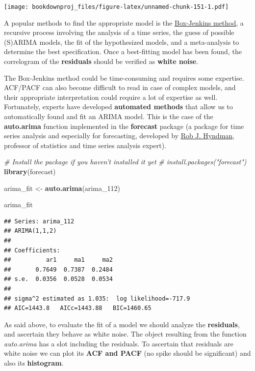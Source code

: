 \documentclass[
]{article}
\newenvironment{Shaded}{\begin{snugshade}}{\end{snugshade}}
\newcommand{\CommentTok}[1]{\textcolor[rgb]{0.56,0.35,0.01}{\textit{#1}}}
\newcommand{\DecValTok}[1]{\textcolor[rgb]{0.00,0.00,0.81}{#1}}
\newcommand{\KeywordTok}[1]{\textcolor[rgb]{0.13,0.29,0.53}{\textbf{#1}}}
\newcommand{\NormalTok}[1]{#1}
\newcommand{\StringTok}[1]{\textcolor[rgb]{0.31,0.60,0.02}{#1}}
\begin{document}
\texttt{[image: bookdownproj\_files/figure-latex/unnamed-chunk-151-1.pdf]}

A popular methods to find the appropriate model is the \href{https://en.wikipedia.org/wiki/Box–Jenkins_method}{Box-Jenkins method}, a recursive process involving the analysis of a time series, the guess of possible (S)ARIMA models, the fit of the hypothesized models, and a meta-analysis to determine the best specification. Once a best-fitting model has been
found, the correlogram of the \textbf{residuals} should be verified as \textbf{white noise}.

The Box-Jenkins method could be time-consuming and requires some expertise. ACF/PACF can also become difficult to read in case of complex models, and their appropriate interpretation could require a lot of expertise as well. Fortunately, experts have developed \textbf{automated methods} that allow us to automatically found and fit an ARIMA model. This is the case of the \textbf{auto.arima} function implemented in the \textbf{forecast} package (a package for time series analysis and especially for forecasting, developed by \href{https://scholar.google.com/citations?user=vamErfkAAAAJ\&hl=en\&oi=ao}{Rob J. Hyndman}, professor of statistics and time series analysis expert).

\begin{Shaded}
\begin{Highlighting}[]
\CommentTok{# Install the package if you haven't installed it yet}
\CommentTok{# install.packages("forecast")}
\KeywordTok{library}\NormalTok{(forecast)}

\NormalTok{arima_fit <-}\StringTok{ }\KeywordTok{auto.arima}\NormalTok{(arima_}\DecValTok{112}\NormalTok{)}

\NormalTok{arima_fit}
\end{Highlighting}
\end{Shaded}

\begin{verbatim}
## Series: arima_112 
## ARIMA(1,1,2) 
## 
## Coefficients:
##          ar1     ma1     ma2
##       0.7649  0.7387  0.2484
## s.e.  0.0356  0.0528  0.0534
## 
## sigma^2 estimated as 1.035:  log likelihood=-717.9
## AIC=1443.8   AICc=1443.88   BIC=1460.65
\end{verbatim}

As said above, to evaluate the fit of a model we should analyze the \textbf{residuals}, and ascertain they behave as white noise. The object resulting from the function \emph{auto.arima} has a slot including the residuals. To ascertain that residuals are white noise we can plot its \textbf{ACF and PACF} (no spike should be significant) and also its \textbf{histogram}.
\end{document}
